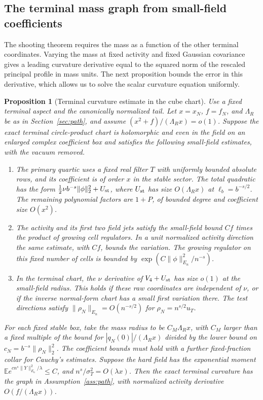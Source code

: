 \documentclass[11pt]{article}
\newtheorem{proposition}[theorem]{Proposition}
\theoremstyle{definition}
\newcommand{\E}{\mathbb E}
\begin{document}
\subsection{The terminal mass graph from small-field coefficients}
\label{sec:mass-graph}

The shooting theorem requires the mass as a function of the other
terminal coordinates. Varying the mass at fixed activity and fixed
Gaussian covariance gives a leading curvature derivative equal to
the squared norm of the rescaled principal profile in mass units.
The next proposition bounds the error in this derivative, which
allows us to solve the scalar curvature equation uniformly.

\begin{proposition}[Terminal curvature estimate in the cube chart]
\label{prop:terminal-graph}
Use a fixed terminal aspect and the canonically normalized tail.
Let \(x=x_N\), \(f=f_N\), and \(\Lambda_R\) be as in
Section~\ref{sec:path}, and assume
\((x^2+f)/(\Lambda_R x)=o(1)\). Suppose the exact terminal
circle-product chart is holomorphic and even in the field on
an enlarged complex coefficient box and satisfies
the following small-field estimates, with the vacuum removed.
\begin{enumerate}
\item The primary quartic uses a fixed real filter \(T\) with
uniformly bounded absolute rows, and its coefficient is of order
\(x\) in the stable sector. The total quadratic has the form
\(\tfrac12 \nu b^{-s}\|\phi\|_2^2+U_{\rm st}\), where
\(U_{\rm st}\) has size \(O(\Lambda_R x)\) at
\(\ell_b=b^{-s/2}\). The remaining polynomial factors are
\(1+P\), of bounded degree and coefficient size \(O(x^2)\).
\item The activity and its first two field jets satisfy the
small-field bound \(Cf\) times the product of growing cell
regulators. In a unit normalized activity direction the same
estimate, with \(Cf\), bounds the variation. The growing
regulator on this fixed number of cells is bounded by
\(\exp(C\|\phi\|_{E_n}^2/n^{-s})\).
\item In the terminal chart, the \(\nu\) derivative of
\(V_4+U_{\rm st}\) has size \(o(1)\) at the small-field
radius. This holds if these raw coordinates are independent
of \(\nu\), or if the inverse normal-form chart has a small
first variation there. The test directions satisfy
\(\|\rho_N\|_{E_n}=O(n^{-s/2})\) for
\(\rho_N=n^{s/2}u_T\).
\end{enumerate}
For each fixed stable box, take the mass radius to be
\(C_M\Lambda_R x\), with \(C_M\) larger than a fixed multiple of
the bound for \(|q_N(0)|/(\Lambda_R x)\) divided by the lower
bound on \(c_N=b^{-s}\|\rho_N\|_2^2\). The coefficient bounds must
hold with a further fixed-fraction collar for Cauchy's estimates.
Suppose the hard field has the exponential moment
\(\E e^{c n^s\|Y\|_{E_n}^2/\lambda}\le C\), and
\(n^s/\sigma_T^2=O(\lambda x)\).
Then the exact terminal curvature has the graph in
Assumption~\ref{ass:path}, with normalized activity derivative
\(O(f/(\Lambda_R x))\).
\end{proposition}
\end{document}
